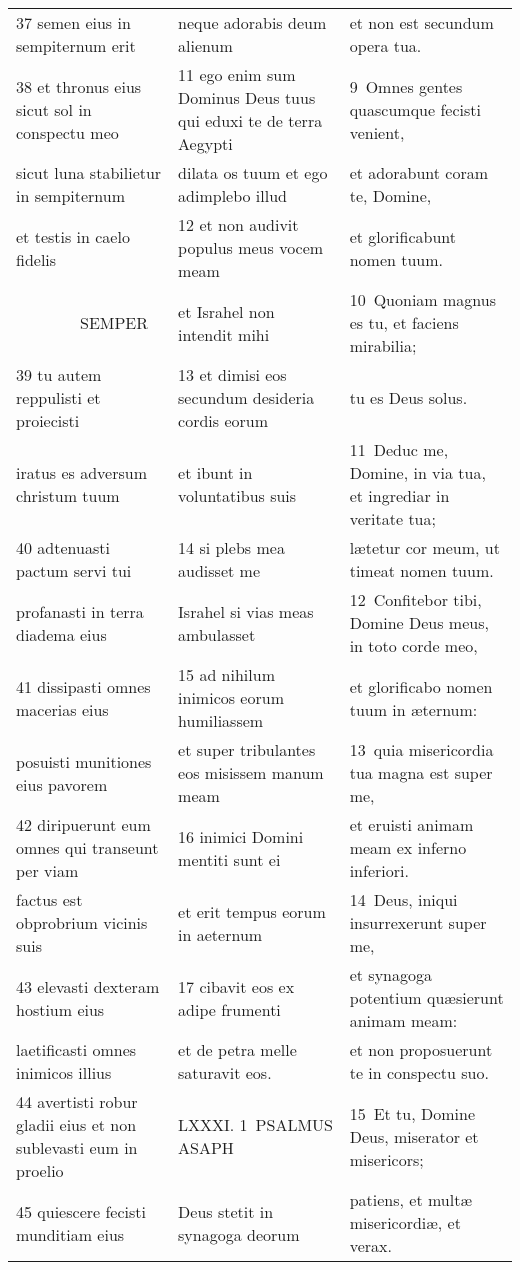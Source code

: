 \documentclass{article}
\begin{document}
\begin{longtable}{@{}p{}p{}p{}@{}}
37 semen eius in sempiternum erit	&	neque adorabis deum alienum	&	et non est secundum opera tua.	\\
38 et thronus eius sicut sol in conspectu meo	&	11 ego enim sum Dominus Deus tuus qui eduxi te de terra Aegypti	&	9 Omnes gentes quascumque fecisti venient,	\\
sicut luna stabilietur in sempiternum	&	dilata os tuum et ego adimplebo illud	&	et adorabunt coram te, Domine,	\\
et testis in caelo fidelis	&	12 et non audivit populus meus vocem meam	&	et glorificabunt nomen tuum.	\\
    SEMPER	&	et Israhel non intendit mihi	&	10 Quoniam magnus es tu, et faciens mirabilia;	\\
39 tu autem reppulisti et proiecisti	&	13 et dimisi eos secundum desideria cordis eorum	&	tu es Deus solus.	\\
iratus es adversum christum tuum	&	et ibunt in voluntatibus suis	&	11 Deduc me, Domine, in via tua, et ingrediar in veritate tua;	\\
40 adtenuasti pactum servi tui	&	14 si plebs mea audisset me	&	lætetur cor meum, ut timeat nomen tuum.	\\
profanasti in terra diadema eius	&	Israhel si vias meas ambulasset	&	12 Confitebor tibi, Domine Deus meus, in toto corde meo,	\\
41 dissipasti omnes macerias eius	&	15 ad nihilum inimicos eorum humiliassem	&	et glorificabo nomen tuum in æternum:	\\
posuisti munitiones eius pavorem	&	et super tribulantes eos misissem manum meam	&	13 quia misericordia tua magna est super me,	\\
42 diripuerunt eum omnes qui transeunt per viam	&	16 inimici Domini mentiti sunt ei	&	et eruisti animam meam ex inferno inferiori.	\\
factus est obprobrium vicinis suis	&	et erit tempus eorum in aeternum	&	14 Deus, iniqui insurrexerunt super me,	\\
43 elevasti dexteram hostium eius	&	17 cibavit eos ex adipe frumenti	&	et synagoga potentium quæsierunt animam meam:	\\
laetificasti omnes inimicos illius	&	et de petra melle saturavit eos.	&	et non proposuerunt te in conspectu suo.	\\
44 avertisti robur gladii eius et non sublevasti eum in proelio	&	LXXXI. 1 PSALMUS ASAPH	&	15 Et tu, Domine Deus, miserator et misericors;	\\
45 quiescere fecisti munditiam eius	&	Deus stetit in synagoga deorum	&	patiens, et multæ misericordiæ, et verax.	\\

\end{longtable}
\end{document}
